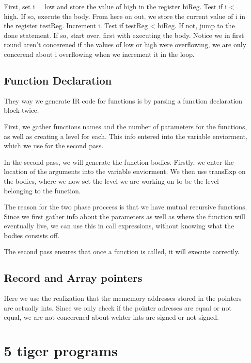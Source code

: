 \documentclass{article}
\begin{document}
First, set i = low and store the value of high in the register hiReg. Test if i <= high. If so, execute the body. From here on out, we store the current value of i in the register testReg. Increment i. Test if testReg < hiReg. If not, jump to the done statement. If so, start over, first with executing the body. Notice we in first round aren't concerened if the values of low or high were overflowing, we are only concerend about i overflowing when we increment it in the loop.

\subsection{Function Declaration}
They way we generate IR code for functions is by parsing a function declaration block twice.

First, we gather functions names and the number of parameters for the functions, as well as creating a level for each. This info entered into the variable enviorment, which we use for the second pass.

In the second pass, we will generate the function bodies. Firstly, we enter the location of the arguments into the variable enviorment. We then use transExp on the bodies, where we now set the level we are working on to be the level belonging to the function.

The reason for the two phase proccess is that we have mutual recursive functions. Since we first gather info about the parameters as well as where the function will eventually live, we can use this in call expressions, without knowing what the bodies consists off.

The second pass ensures that once a function is called, it will execute correctly.

\subsection{Record and Array pointers}
Here we use the realization that the mememory addresses stored in the pointers are actually ints. Since we only check if the pointer adresses are equal or not equal, we are not concerened about wehter ints are signed or not signed.

\section{5 tiger programs}
\end{document}
